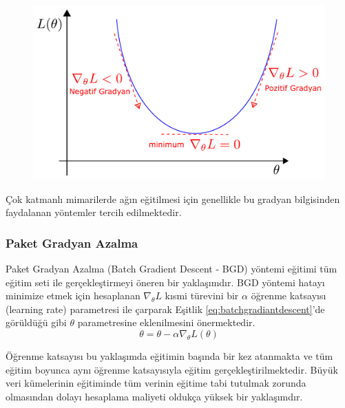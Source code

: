 \begin{figure}[h!]
	\begin{center}
		\vspace{0.4cm}
		{
			\vspace{0.4cm}
			\includegraphics[scale=0.5]{Yapilan-Calismalar/Figures/gradyan.pdf}
		}
	\end{center}
\end{figure}

Çok katmanlı mimarilerde ağın eğitilmesi için genellikle bu gradyan bilgisinden faydalanan yöntemler tercih edilmektedir.

\subsubsection{Paket Gradyan Azalma}
Paket Gradyan Azalma (Batch Gradient Descent - BGD) yöntemi eğitimi tüm eğitim seti ile gerçekleştirmeyi öneren bir yaklaşımdır. BGD yöntemi hatayı minimize etmek için hesaplanan $\nabla_{\theta}L$ kısmi türevini bir $\alpha$ öğrenme katsayısı (learning rate) parametresi ile çarparak Eşitlik \ref{eq:batchgradiantdescent}'de görüldüğü gibi $\theta$ parametresine eklenilmesini önermektedir.
\begin{equation}
	\label{eq:batchgradiantdescent}
	\theta = \theta - \alpha \nabla_{\theta}L(\theta)
\end{equation} 

Öğrenme katsayısı bu yaklaşımda eğitimin başında bir kez atanmakta ve tüm eğitim boyunca aynı öğrenme katsayısıyla eğitim gerçekleştirilmektedir. Büyük veri kümelerinin eğitiminde tüm verinin eğitime tabi tutulmak zorunda olmasından dolayı hesaplama maliyeti oldukça yüksek bir yaklaşımdır.

